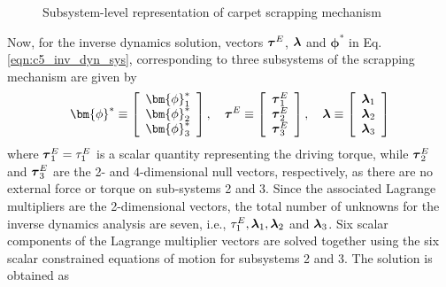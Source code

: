 {\begin{figure}[t]
\begin{center}
		\end{center}
		\caption{Subsystem-level representation of carpet scrapping mechanism}
		\label{fig:c5cs_subsystems}
	\end{figure}
Now, for the inverse dynamics solution, vectors $\mbox{\boldmath$\tau$}^E$, $\mbox{\boldmath$\lambda$}$ and $\bm{\phi}^*$ in Eq. \ref{eqn:c5_inv_dyn_sys}, corresponding to three subsystems of the scrapping mechanism are given by
	\begin{equation}
	\bm{\phi}^* \equiv 
	\left[ \begin{array}{c}
	\bm{\phi}_1^*\\
	\bm{\phi}_2^*\\
	\bm{\phi}_3^*\\
	\end{array} \right], \hspace{10pt}
	\mbox{\boldmath$\tau$}^E \equiv 
	\left[ \begin{array}{c}
	\mbox{\boldmath$\tau$}_1^E\\
	\mbox{\boldmath$\tau$}_2^E\\
	\mbox{\boldmath$\tau$}_3^E\\
	\end{array} \right], \hspace{10pt}
	\mbox{\boldmath$\lambda$} \equiv
	\left[ \begin{array}{c}
	\mbox{\boldmath$\lambda$}_1\\
	\mbox{\boldmath$\lambda$}_2\\
	\mbox{\boldmath$\lambda$}_3\\
	\end{array} \right]
	\end{equation}
where $\mbox{\boldmath$\tau$}_1^E = \tau_1^E$ is a scalar quantity representing the driving torque, while $\mbox{\boldmath$\tau$}_2^E$ and $\mbox{\boldmath$\tau$}_3^E$ are the 2- and 4-dimensional null vectors, respectively, as there are no external force or torque on sub-systems 2 and 3. Since the associated Lagrange multipliers are the 2-dimensional vectors, the total number of unknowns for the inverse dynamics analysis are seven, i.e., $\tau_1^E , \mbox{\boldmath$\lambda$}_1, \mbox{\boldmath$\lambda$}_2$ and $\mbox{\boldmath$\lambda$}_3$. Six scalar components of the Lagrange multiplier vectors are solved together using the six scalar constrained equations of motion for subsystems 2 and 3. The solution is obtained as
	\begin{equation}

\end{equation}}
